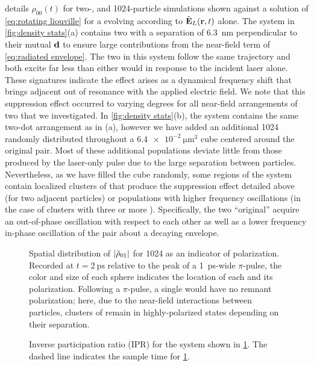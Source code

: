  details $\rho_{00}(t)$ for two-, and 1024-particle simulations shown against a solution of \cref{eq:rotating liouville} for a \qd{} evolving according to $\tilde{\vb{E}}_L(\vb{r}, t)$ alone.
The system in \cref{fig:density stats}(a) contains two \qds{} with a separation of \SI{6.3}{\nano\meter} perpendicular to their mutual $\vb{d}$ to ensure large contributions from the near-field term of \cref{eq:radiated envelope}.
The two \qds{} in this system follow the same trajectory and both excite far less than either would in response to the incident laser alone.
These signatures indicate the effect arises as a dynamical frequency shift that brings adjacent \qds{} out of resonance with the applied electric field.
We note that this suppression effect occurred to varying degrees for all near-field arrangements of two \qds{} that we investigated.
In \cref{fig:density stats}(b), the system contains the same two-dot arrangement as in (a), however we have added an additional 1024 \qds{} randomly distributed throughout a $\SI{6.4e-2}{\micro\meter\cubed}$ cube centered around the original pair.
Most of these additional \qd{} populations deviate little from those produced by the laser-only pulse due to the large separation between particles.
Nevertheless, as we have filled the cube randomly, some regions of the system contain localized clusters of \qds{} that produce the suppression effect detailed above (for two adjacent particles) or populations with higher frequency oscillations (in the case of clusters with three or more \qds{}).
Specifically, the two ``original'' \qds{} acquire an out-of-phase oscillation with respect to each other as well as a lower frequency in-phase oscillation of the pair about a decaying envelope.


\begin{figure}
  \centering
  
  \caption{\label{fig:nearfield box}Spatial distribution of $\abs{\tilde{\rho}_{01}}$ for 1024 \qds{} as an indicator of polarization.
    Recorded at $t = \SI{2}{\pico\second}$ relative to the peak of a \SI{1}{\pico\second}-wide $\pi$-pulse, the color and size of each sphere indicates the location of each \qd{} and its polarization.
    Following a $\pi$-pulse, a single \qd{} would have no remnant polarization; here, due to the near-field interactions between particles, clusters of \qds{} remain in highly-polarized states depending on their separation.
  }
\end{figure}

\begin{figure}
  \centering
  
  \caption{\label{fig:ipr}Inverse participation ratio (IPR) for the system shown in \cref{fig:nearfield box}. The dashed line indicates the sample time for \cref{fig:nearfield box}.}
\end{figure}

